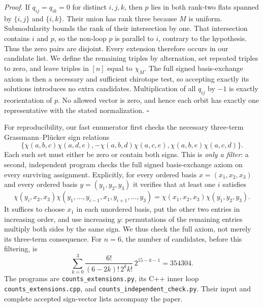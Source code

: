 \documentclass[11pt,a4paper]{article}
\begin{document}
\emph{Proof.}
If $q_{ij}=q_{ik}=0$ for distinct $i,j,k$, then $p$ lies in both
rank-two flats spanned by $\{i,j\}$ and $\{i,k\}$. Their union has
rank three because $M$ is uniform. Submodularity bounds the rank of
their intersection by one. That intersection contains $i$ and $p$,
so the non-loop $p$ is parallel to $i$, contrary to the hypothesis.
Thus the zero pairs are disjoint. Every extension therefore occurs in
our candidate list. We define the remaining triples by alternation,
set repeated triples to zero, and leave triples in $[n]$ equal to
$\chi_M$. The full signed basis-exchange axiom is then a necessary
and sufficient chirotope test, so accepting exactly its solutions
introduces no extra candidates. Multiplication of all $q_{ij}$ by
$-1$ is exactly reorientation of $p$. No allowed vector is zero, and
hence each orbit has exactly one representative with the stated
normalization. \hfill$\square$

For reproducibility, our fast enumerator first checks the necessary
three-term Grassmann--Pl\"ucker sign relations
\[
 \bigl\{
 \chi(a,b,c)\chi(a,d,e),
 -\chi(a,b,d)\chi(a,c,e),
 \chi(a,b,e)\chi(a,c,d)
 \bigr\}.
\]
Each such set must either be zero or contain both signs. This is
\emph{only a filter}: a second, independent program checks the full
signed basis-exchange axiom on every surviving assignment. Explicitly,
for every ordered basis $x=(x_1,x_2,x_3)$ and every ordered basis
$y=(y_1,y_2,y_3)$ it verifies that at least one $i$ satisfies
\[
 \chi(y_i,x_2,x_3)
 \chi(y_1,\ldots,y_{i-1},x_1,y_{i+1},\ldots,y_3)
 =\chi(x_1,x_2,x_3)\chi(y_1,y_2,y_3).
\]
It suffices to choose $x_1$ in each unordered basis, put the other two
entries in increasing order, and use increasing $y$: permutations of
the remaining entries multiply both sides by the same sign. We thus
check the full axiom, not merely its three-term consequence. For
$n=6$, the number of candidates, before this filtering, is
\[
 \sum_{k=0}^{3}
 \frac{6!}{(6-2k)!\,2^k k!}\,2^{15-k-1}=354304.
\]
The programs are \texttt{counts\_extensions.py}, its C++ inner loop
\texttt{counts\_extensions.cpp}, and
\texttt{counts\_independent\_check.py}. Their input and complete accepted
sign-vector lists accompany the paper.
\end{document}
